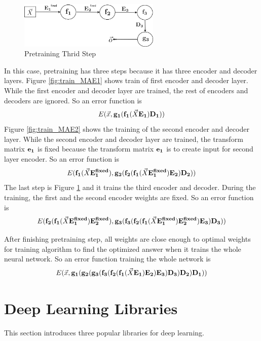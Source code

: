 \documentclass[draft,dvipsnames]{drexel-thesis}
\begin{document}
\begin{thesis}
\begin{figure}[t!]
    \centering
    \includegraphics[width=0.6\textwidth]{pictures/figures/train_MAE3.png}
    \caption{Pretraining Thrid Step}
    \label{fig:train_MAE3}
\end{figure}

	In this case, pretraining has three steps because it has three encoder and decoder layers. Figure \ref{fig:train_MAE1} shows train of first encoder and decoder layer. While the first encoder and decoder layer are trained, the rest of encoders and decoders are ignored. So an error function is
$$E(\vec{x}, \bold{g_1}(\bold{f_1}(\vec{X}\bold{E_1})\bold{D_1}))$$
Figure \ref{fig:train_MAE2} shows the training of the second encoder and decoder layer. While the second encoder and decoder layer are trained, the transform matrix $\bold{e_1}$ is fixed because the transform matrix $\bold{e_1}$ is to create input for second layer encoder. So an error function is
$$E(\bold{f_1}(\vec{X}\bold{E_1^{fixed}}), \bold{g_2}(\bold{f_2}(\bold{f_1}(\vec{X}\bold{E_1^{fixed}})\bold{E_2})\bold{D_2}))$$
The last step is Figure \ref{fig:train_MAE3} and it trains the third encoder and decoder. During the training, the first and the second encoder weights are fixed. So an error function is
$$E(\bold{f_2}(\bold{f_1}(\vec{X}\bold{E_1^{fixed}})\bold{E_2^{fixed}}), \bold{g_3}(\bold{f_3}(\bold{f_2}(\bold{f_1}(\vec{X}\bold{E_1^{fixed}})\bold{E_2^{fixed}})\bold{E_3})\bold{D_3}))$$

	After finishing pretraining step, all weights are close enough to optimal weights for training algorithm to find the optimized answer when it trains the whole neural network. So an error function training the whole network is
$$E(\vec{x}, \bold{g_1}(\bold{g_2}(\bold{g_3}(\bold{f_3}(\bold{f_2}(\bold{f_1}(\vec{X}\bold{E_1})\bold{E_2})\bold{E_3})\bold{D_3})\bold{D_2})\bold{D_1}))$$


\section{Deep Learning Libraries}\label{sec:DLL}
This section introduces three popular libraries for deep learning.


\end{thesis}
\end{document}

